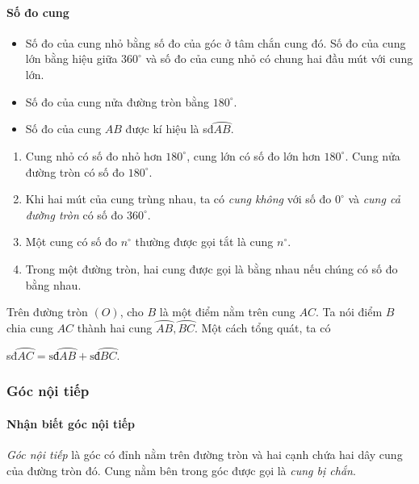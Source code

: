 \begin{tomtat}
\paragraph{Số đo cung}
\begin{boxdn}
	\begin{itemize}
	\item Số đo của cung nhỏ bằng số đo của góc ở tâm chắn cung đó. Số đo của cung lớn bằng hiệu giữa $360^{\circ}$ và số đo của cung nhỏ có chung hai đầu mút với cung lớn.
	\item Số đo của cung nửa đường tròn bằng $180^{\circ}$.	
	\item Số đo của cung $AB$ được kí hiệu là sđ$\wideparen{AB}$.
	\end{itemize}
\end{boxdn}
\begin{note}
	\begin{enumerate}[\bf ---]
	\item Cung nhỏ có số đo nhỏ hơn $180^{\circ}$, cung lớn có số đo lớn hơn $180^{\circ}$. Cung nửa đường tròn có số đo $180^{\circ}$.
	\item Khi hai mút của cung trùng nhau, ta có \textit{cung không} với số đo $0^{\circ}$ và \textit{cung cả đường tròn} có số đo $360^{\circ}$.
	\item Một cung có số đo $n^{\circ}$ thường được gọi tắt là cung $n^{\circ}$.
	\item Trong một đường tròn, hai cung được gọi là bằng nhau nếu chúng có số đo bằng nhau.
	\end{enumerate}
\end{note}
\begin{boxdn}
	Trên đường tròn $(O)$, cho $B$ là một điểm nằm trên cung $AC$. Ta nói điểm $B$ chia cung $AC$ thành hai cung $\wideparen{AB}, \wideparen{BC}$. Một cách tổng quát, ta có
	\begin{center}
	sđ$\wideparen{AC}=\text{sđ}\wideparen{AB}+ \text{sđ} \wideparen{BC}$.
	\end{center}
\end{boxdn}
\subsubsection{Góc nội tiếp}
\paragraph{Nhận biết góc nội tiếp}
\begin{boxdn}
	\textit{Góc nội tiếp} là góc có đỉnh nằm trên đường tròn và hai cạnh chứa hai dây cung của đường tròn đó. Cung nằm bên trong góc được gọi là \textit{cung bị chắn}.
\end{boxdn}

\end{tomtat}
